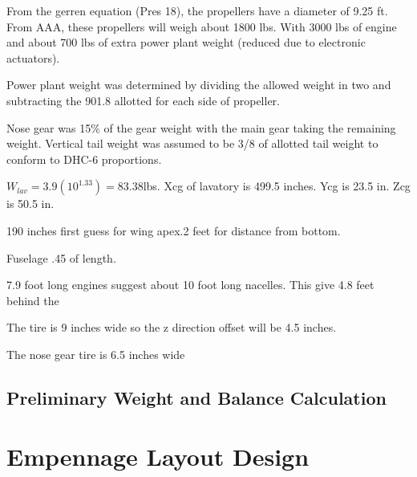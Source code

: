 \documentclass[conf]{new-aiaa}
\begin{document}
From the gerren equation (Pres 18), the propellers have a diameter of 9.25 ft. From AAA, these propellers will weigh about 1800 lbs. With 3000 lbs of engine and about 700 lbs of extra power plant weight (reduced due to electronic actuators).

Power plant weight was determined by dividing the allowed weight in two and subtracting the 901.8 allotted for each side of propeller.

Nose gear was 15\% of the gear weight with the main gear taking the remaining weight. Vertical tail weight was assumed to be 3/8 of allotted tail weight to conform to DHC-6 proportions.

$W_{lav} = 3.9(10^{1.33})=83.38$lbs. Xcg of lavatory is 499.5 inches. Ycg is 23.5 in. Zcg is 50.5 in.

190 inches first guess for wing apex.2 feet for distance from bottom.

Fuselage .45 of length.

7.9 foot long engines suggest about 10 foot long nacelles. This give 4.8 feet behind the 

The tire is 9 inches wide so the z direction offset will be 4.5 inches.

The nose gear tire is 6.5 inches wide


\subsection{Preliminary Weight and Balance Calculation}


\section{Empennage Layout Design}
\end{document}
